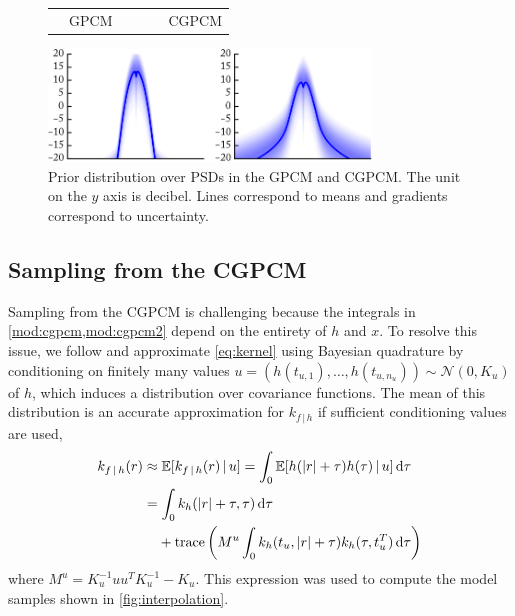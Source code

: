 \documentclass{article}
\newcommand{\id}[1]{\, \mathrm{d} #1}     %
\newcommand{\cond}{\, | \,}               %
\newcommand{\phan}[1]{\hphantom{#1\;}}
\begin{document}
\begin{figure}[t]
    \centering
    \begin{tabularx}{\linewidth}{>{\centering}X>{\centering}X}
        ~~GPCM & ~~~~~~CGPCM
    \end{tabularx}
    \includegraphics[width=\linewidth, height=3cm]{resources/cropped/prior_psd.pdf}
    \caption{Prior distribution over PSDs in the GPCM and CGPCM. The unit on the $y$ axis is decibel. Lines correspond to means and gradients correspond to uncertainty.}
    \label{fig:prior_psd}
\end{figure}

\subsection{Sampling from the CGPCM}
Sampling from the CGPCM is challenging because the integrals in \cref{mod:cgpcm,mod:cgpcm2} depend on the entirety of $h$ and $x$. To resolve this issue, we follow \citet{Tobar:2015:Learning_Stationary} and approximate \cref{eq:kernel} using Bayesian quadrature \cite{Minka:2000:Quadrature_GP} by conditioning on finitely many values $u=(h(t_{u,1}),\ldots,h(t_{u,n_u}))\sim \mathcal{N}(0,K_u)$ of $h$, which induces a  distribution over covariance functions. The mean of this distribution is an accurate approximation for $k_{f\cond h}$ if sufficient conditioning values are used,
\begin{align*}
    k_{f\cond h}(r)
    &\approx \mathbb{E}[k_{f\cond h}(r)\cond u]
    = \int_{0} \mathbb{E}[h(|r| + \tau) h(\tau)\cond u] \id{\tau} \\
    &= \int_0 k_h(|r| + \tau, \tau) \id{\tau} \\
    &\phan{=}+ \mathrm{trace} \left( M^u \int_{0} k_h(t_u, |r|+ \tau)k_h(\tau, t_u^T) \id{\tau} \right)
\end{align*}
where $M^{u}=K_u^{-1}uu^T K_u^{-1}-K_u$. This expression was used to compute the model samples shown in \cref{fig:interpolation}. %
\end{document}

